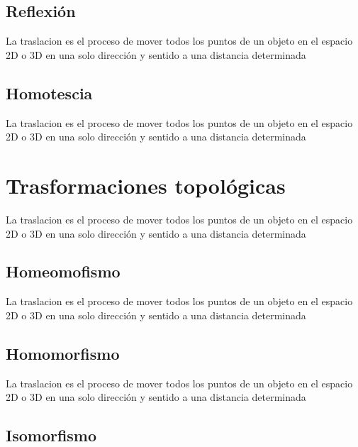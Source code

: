 \documentclass[
  16pt,
]{krantz}
\theoremstyle{definition}
\theoremstyle{definition}
\theoremstyle{definition}
\theoremstyle{definition}
\theoremstyle{remark}
\begin{document}
\hypertarget{reflexiuxf3n}{%
\subsection{Reflexión}\label{reflexiuxf3n}}

La traslacion es el proceso de mover todos los puntos de un objeto en el espacio 2D o 3D en una solo dirección y sentido a una distancia determinada

\hypertarget{homotescia}{%
\subsection{Homotescia}\label{homotescia}}

La traslacion es el proceso de mover todos los puntos de un objeto en el espacio 2D o 3D en una solo dirección y sentido a una distancia determinada

\hypertarget{trasformaciones-topoluxf3gicas}{%
\section{Trasformaciones topológicas}\label{trasformaciones-topoluxf3gicas}}

La traslacion es el proceso de mover todos los puntos de un objeto en el espacio 2D o 3D en una solo dirección y sentido a una distancia determinada

\hypertarget{homeomofismo}{%
\subsection{Homeomofismo}\label{homeomofismo}}

La traslacion es el proceso de mover todos los puntos de un objeto en el espacio 2D o 3D en una solo dirección y sentido a una distancia determinada

\hypertarget{homomorfismo}{%
\subsection{Homomorfismo}\label{homomorfismo}}

La traslacion es el proceso de mover todos los puntos de un objeto en el espacio 2D o 3D en una solo dirección y sentido a una distancia determinada \citep{xie2015}

\hypertarget{isomorfismo}{%
\subsection{Isomorfismo}\label{isomorfismo}}
\end{document}
